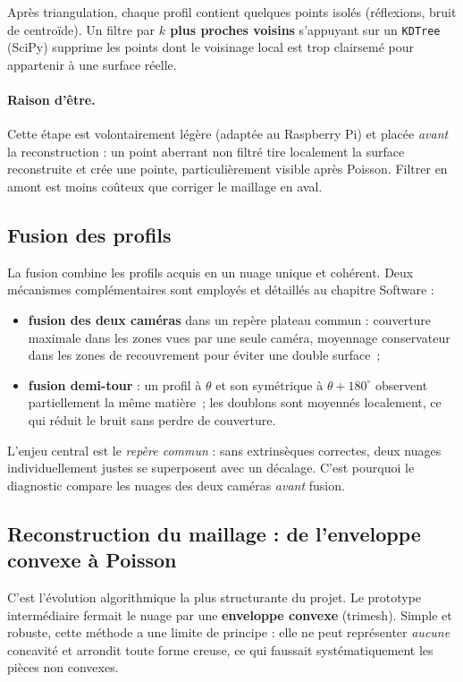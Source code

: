Après triangulation, chaque profil contient quelques points isolés
(réflexions, bruit de centroïde). Un filtre par \textbf{$k$ plus proches
voisins} s'appuyant sur un \texttt{KDTree} (SciPy) supprime les points dont le
voisinage local est trop clairsemé pour appartenir à une surface réelle.

\paragraph{Raison d'être.}
Cette étape est volontairement légère (adaptée au Raspberry Pi) et placée
\emph{avant} la reconstruction : un point aberrant non filtré tire localement
la surface reconstruite et crée une pointe, particulièrement visible après
Poisson. Filtrer en amont est moins coûteux que corriger le maillage en aval.

\subsection{Fusion des profils}

La fusion combine les profils acquis en un nuage unique et cohérent. Deux
mécanismes complémentaires sont employés et détaillés au chapitre Software :

\begin{itemize}
  \item \textbf{fusion des deux caméras} dans un repère plateau commun :
        couverture maximale dans les zones vues par une seule caméra,
        moyennage conservateur dans les zones de recouvrement pour éviter une
        double surface~;
  \item \textbf{fusion demi-tour} : un profil à $\theta$ et son symétrique à
        $\theta+180^\circ$ observent partiellement la même matière~; les
        doublons sont moyennés localement, ce qui réduit le bruit sans perdre
        de couverture.
\end{itemize}

L'enjeu central est le \emph{repère commun} : sans extrinsèques correctes, deux
nuages individuellement justes se superposent avec un décalage. C'est pourquoi
le diagnostic compare les nuages des deux caméras \emph{avant} fusion.

\subsection{Reconstruction du maillage : de l'enveloppe convexe à Poisson}

C'est l'évolution algorithmique la plus structurante du projet. Le prototype
intermédiaire fermait le nuage par une \textbf{enveloppe convexe} (trimesh).
Simple et robuste, cette méthode a une limite de principe : elle ne peut
représenter \emph{aucune} concavité et arrondit toute forme creuse, ce qui
faussait systématiquement les pièces non convexes.

